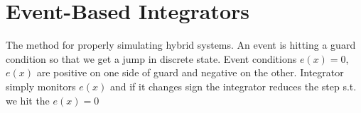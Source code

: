 \section{Event-Based Integrators}
The method for properly simulating hybrid systems. An event is hitting a guard condition so that we get a jump in discrete state. Event conditions $e(x)=0$,$e(x)$ are positive on one side of guard and negative on the other. Integrator simply monitors $e(x)$ and if it changes sign the integrator reduces the step s.t. we hit the $e(x)=0$